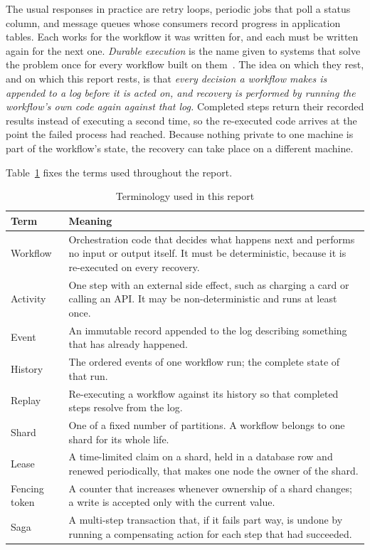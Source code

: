 The usual responses in practice are retry loops, periodic jobs that poll a
status column, and message queues whose consumers record progress in
application tables. Each works for the workflow it was written for, and each
must be written again for the next one. \emph{Durable execution} is the name
given to systems that solve the problem once for every workflow built on
them~\cite{temporaldocs, restatedocs}. The idea on which they rest, and on
which this report rests, is that \emph{every decision a workflow makes is
appended to a log before it is acted on, and recovery is performed by running
the workflow's own code again against that log.} Completed steps return their
recorded results instead of executing a second time, so the re-executed code
arrives at the point the failed process had reached. Because nothing private
to one machine is part of the workflow's state, the recovery can take place on
a different machine.

Table~\ref{tab:terminology} fixes the terms used throughout the report.

\begin{table}[htbp]
  \centering
  \caption{Terminology used in this report}
  \label{tab:terminology}
  \small
  \begin{tabular}{|p{1.11in}|p{4.25in}|}
    \hline
    \textbf{Term} & \textbf{Meaning} \\
    \hline
    Workflow & Orchestration code that decides what happens next and performs
      no input or output itself. It must be deterministic, because it is
      re-executed on every recovery. \\
    \hline
    Activity & One step with an external side effect, such as charging a card
      or calling an API. It may be non-deterministic and runs at least once. \\
    \hline
    Event & An immutable record appended to the log describing something that
      has already happened. \\
    \hline
    History & The ordered events of one workflow run; the complete state of
      that run. \\
    \hline
    Replay & Re-executing a workflow against its history so that completed
      steps resolve from the log. \\
    \hline
    Shard & One of a fixed number of partitions. A workflow belongs to one
      shard for its whole life. \\
    \hline
    Lease & A time-limited claim on a shard, held in a database row and
      renewed periodically, that makes one node the owner of the shard. \\
    \hline
    Fencing token & A counter that increases whenever ownership of a shard
      changes; a write is accepted only with the current value. \\
    \hline
    Saga & A multi-step transaction that, if it fails part way, is undone by
      running a compensating action for each step that had succeeded. \\
    \hline
  \end{tabular}
\end{table}


